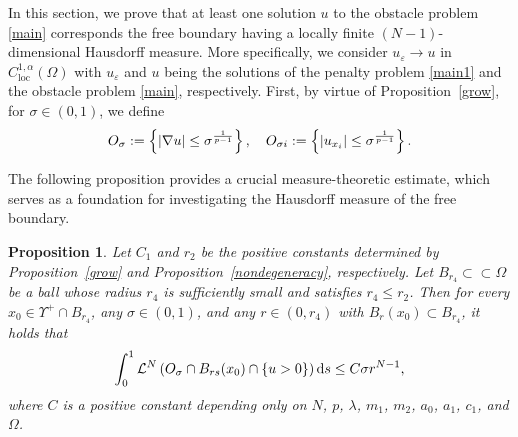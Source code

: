\documentclass[onecolumn]{autart}
\newtheorem{proposition}{Proposition}
\begin{document}
	
	
	In this section,  we prove that   at least one solution $u$  to the obstacle problem \eqref{main} corresponds  the free boundary having a locally finite $(N-1)$-dimensional Hausdorff measure.
	More specifically, we consider  $u_{\varepsilon} \to u$ in $C^{1,\alpha}_{\mathrm{loc}}(\Omega)$ with $u_{\varepsilon}$ and $u$  being {the solutions of the penalty problem \eqref{main1} and the obstacle problem \eqref{main},} respectively.
	First, by virtue of Proposition~\ref{grow}, for $\sigma\in(0,1)$, we define
	\begin{align}
		O_{\sigma}:=\left\{|\nabla u|\le\sigma^{\frac{1}{p-1}}\right\}, \quad
		O_{\sigma i}:=\left\{|u_{x_i}|\le\sigma^{\frac{1}{p-1}}\right\}.\notag
	\end{align}
	
	
	
	The following proposition provides a crucial measure-theoretic estimate, which   serves as a foundation for investigating the Hausdorff measure of the free boundary.
	\begin{proposition}\label{ho2}
		Let $C_1$ and $r_2$ be the positive constants determined by Proposition~\ref{grow} and Proposition~\ref{nondegeneracy}, respectively. Let $B_{r_4}\subset\subset\Omega$ be a ball whose radius $r_4$ is sufficiently small and satisfies $r_4\leq r_2$.	Then   for every
		$x_{0}\in\Upsilon^+ \cap B_{r_4}$, any $\sigma\in(0,1)$, and any $r\in(0,r_4)$ with $B_{r}(x_{0})\subset B_{r_4}$, it holds that
		\begin{align}
			\int_0^1\mathcal{L}^N \left( O_{\sigma}\cap B_{rs}(x_0)\cap\{u>0\}\right)\mathrm{d}s\leq C\sigma r^{N-1},\notag
		\end{align}
		where $C$ is a positive constant depending only on  $N$, $p$,  $\lambda$, $m_1$, $m_2$, $a_0$,  $a_1$, $c_1$,   and $\Omega$.
	\end{proposition}
	
\end{document}
